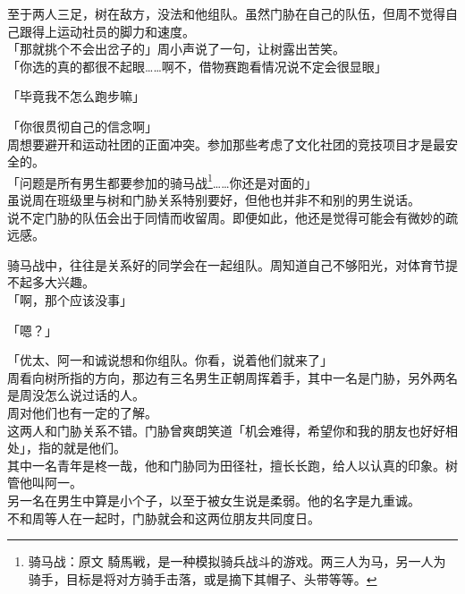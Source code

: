 至于两人三足，树在敌方，没法和他组队。虽然门胁在自己的队伍，但周不觉得自己跟得上运动社员的脚力和速度。\\

「那就挑个不会出岔子的」周小声说了一句，让树露出苦笑。\\

「你选的真的都很不起眼……啊不，借物赛跑看情况说不定会很显眼」

「毕竟我不怎么跑步嘛」

「你很贯彻自己的信念啊」\\

周想要避开和运动社团的正面冲突。参加那些考虑了文化社团的竞技项目才是最安全的。\\

「问题是所有男生都要参加的骑马战\footnote{骑马战：原文 {\jpfont 騎馬戦}，是一种模拟骑兵战斗的游戏。两三人为马，另一人为骑手，目标是将对方骑手击落，或是摘下其帽子、头带等等。}……你还是对面的」\\

虽说周在班级里与树和门胁关系特别要好，但他也并非不和别的男生说话。\\

说不定门胁的队伍会出于同情而收留周。即便如此，他还是觉得可能会有微妙的疏远感。

骑马战中，往往是关系好的同学会在一起组队。周知道自己不够阳光，对体育节提不起多大兴趣。\\

「啊，那个应该没事」

「嗯？」

「优太、阿一和诚说想和你组队。你看，说着他们就来了」\\

周看向树所指的方向，那边有三名男生正朝周挥着手，其中一名是门胁，另外两名是周没怎么说过话的人。\\

周对他们也有一定的了解。\\

这两人和门胁关系不错。门胁曾爽朗笑道「机会难得，希望你和我的朋友也好好相处」，指的就是他们。\\

其中一名青年是柊一哉，他和门胁同为田径社，擅长长跑，给人以认真的印象。树管他叫阿一。\\

另一名在男生中算是小个子，以至于被女生说是柔弱。他的名字是九重诚。\\

不和周等人在一起时，门胁就会和这两位朋友共同度日。\\

